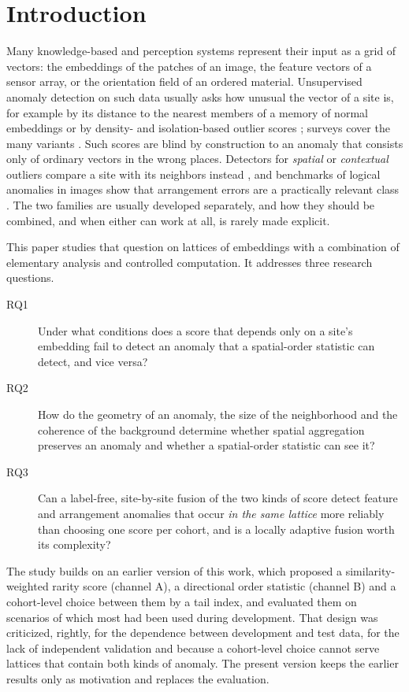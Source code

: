 \section{Introduction}
Many knowledge-based and perception systems represent their input as a grid of vectors: the embeddings of the patches of an image, the feature vectors of a sensor array, or the orientation field of an ordered material. Unsupervised anomaly detection on such data usually asks how unusual the vector of a site is, for example by its distance to the nearest members of a memory of normal embeddings \citep{Roth2022,Defard2021} or by density- and isolation-based outlier scores \citep{Breunig2000,Liu2008}; surveys cover the many variants \citep{Chandola2009,Ruff2021,Pang2021,Aggarwal2017}. Such scores are blind by construction to an anomaly that consists only of ordinary vectors in the wrong places. Detectors for \emph{spatial} or \emph{contextual} outliers compare a site with its neighbors instead \citep{Shekhar2003,Song2007,Schubert2014}, and benchmarks of logical anomalies in images show that arrangement errors are a practically relevant class \citep{Bergmann2022}. The two families are usually developed separately, and how they should be combined, and when either can work at all, is rarely made explicit.

This paper studies that question on lattices of embeddings with a combination of elementary analysis and controlled computation. It addresses three research questions.
\begin{description}
\item[RQ1] Under what conditions does a score that depends only on a site's embedding fail to detect an anomaly that a spatial-order statistic can detect, and vice versa?
\item[RQ2] How do the geometry of an anomaly, the size of the neighborhood and the coherence of the background determine whether spatial aggregation preserves an anomaly and whether a spatial-order statistic can see it?
\item[RQ3] Can a label-free, site-by-site fusion of the two kinds of score detect feature and arrangement anomalies that occur \emph{in the same lattice} more reliably than choosing one score per cohort, and is a locally adaptive fusion worth its complexity?
\end{description}

The study builds on an earlier version of this work, which proposed a similarity-weighted rarity score (channel A), a directional order statistic (channel B) and a cohort-level choice between them by a tail index, and evaluated them on scenarios of which most had been used during development. That design was criticized, rightly, for the dependence between development and test data, for the lack of independent validation and because a cohort-level choice cannot serve lattices that contain both kinds of anomaly. The present version keeps the earlier results only as motivation and replaces the evaluation.

